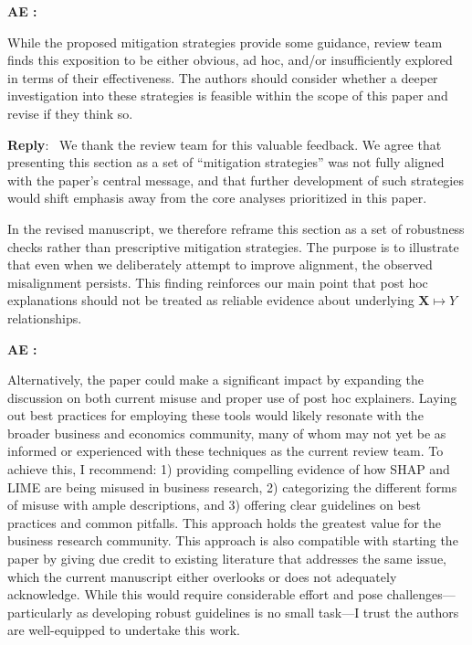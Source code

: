 \documentclass[11pt]{article}
\newcounter{se}[section]
\newcounter{aed}[section]
\newenvironment{aed}[1][]{%
    \refstepcounter{aed}\par\medskip\noindent%
    \textbf{AE \theaed: #1}\rmfamily\itshape%
}{\medskip}
\newcounter{reviewer}
\newcounter{point}[reviewer]
\newenvironment{reply}
 {\par\medskip \noindent \begin{sf}\textbf{Reply}:\ }
 {\medskip \end{sf}}
\begin{document}
\begin{aed}
    While the proposed mitigation strategies provide some guidance, review team finds this exposition to be either obvious, ad hoc, and/or insufficiently explored in terms of their effectiveness. The authors should consider whether a deeper investigation into these strategies is feasible within the scope of this paper and revise if they think so.
\end{aed}
\begin{reply}
We thank the review team for this valuable feedback. We agree that presenting this section as a set of “mitigation strategies” was not fully aligned with the paper’s central message, and that further development of such strategies would shift emphasis away from the core analyses prioritized in this paper.

In the revised manuscript, we therefore reframe this section as a set of robustness checks rather than prescriptive mitigation strategies. The purpose is to illustrate that even when we deliberately attempt to improve alignment, the observed misalignment persists. This finding reinforces our main point that post hoc explanations should not be treated as reliable evidence about underlying $\mathbf{X}\mapsto Y$ relationships.
\end{reply}



\begin{aed}
    Alternatively, the paper could make a significant impact by expanding the discussion on both current misuse and proper use of post hoc explainers. Laying out best practices for employing these tools would likely resonate with the broader business and economics community, many of whom may not yet be as informed or experienced with these techniques as the current review team. To achieve this, I recommend: 1) providing compelling evidence of how SHAP and LIME are being misused in business research, 2) categorizing the different forms of misuse with ample descriptions, and 3) offering clear guidelines on best practices and common pitfalls. This approach holds the greatest value for the business research community. This approach is also compatible with starting the paper by giving due credit to existing literature that addresses the same issue, which the current manuscript either overlooks or does not adequately acknowledge. While this would require considerable effort and pose challenges—particularly as developing robust guidelines is no small task—I trust the authors are well-equipped to undertake this work.
\end{aed}
\end{document}
